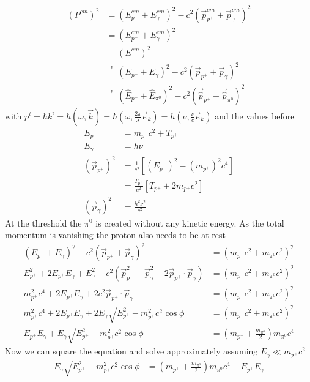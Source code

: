 \documentclass[10pt,a4paper]{article}
\theoremstyle{definition}
\begin{document}
\begin{enumerate}
    \begin{align}
        \left(P^{cm}\right)^2&=(E_{p^+}^{cm}+E_\gamma^{cm})^2-c^2(\vec{p}_{p^+}^{cm}+\vec{p}_\gamma^{cm})^2\\
        &=(E_{p^+}^{cm}+E_\gamma^{cm})^2\\
        &=(E^{cm})^2\\
        &\overset{!}{=}(E_{p^+}+E_\gamma)^2-c^2(\vec{p}_{p^+}+\vec{p}_\gamma)^2\\
        &\overset{!}{=}(\hat{E}_{p^+}+\hat{E}_{\pi^0})^2-c^2(\vec{\hat{p}}_{p^+}+\vec{\hat{p}}_{\pi^0})^2
    \end{align}
    with $p^i=\hbar k^i=\hbar(\omega,\vec{k})=\hbar(\omega,\frac{2\pi}{\lambda}\vec{e}_k)=h(\nu,\frac{\nu}{c}\vec{e}_k)$ and the values before
    \begin{align}
        E_{p^+}&=m_{p^+}c^2+T_{p^+}\\
        E_\gamma&=h\nu\\  
        (\vec{p}_{p^+})^2
        &=\frac{1}{c^2}\left[(E_{p^+})^2-(m_{p^+})^2c^4\right]\\
        &=\frac{T_{p^+}}{c^2}\left[T_{p^+}+2m_{p^+}c^2\right]\\
        (\vec{p}_\gamma)^2&=\frac{h^2\nu^2}{c^2}
    \end{align}
    At the threshold the $\pi^0$ is created without any kinetic energy. As the total momentum is vanishing the proton
    also needs to be at rest
    \begin{align}
        (E_{p^+}+E_\gamma)^2-c^2(\vec{p}_{p^+}+\vec{p}_\gamma)^2&=\left(m_{p^+}c^2+m_{\pi^0}c^2\right)^2\\
        E_{p^+}^2+2E_{p^+}E_\gamma+E_\gamma^2-c^2\left(\vec{p}_{p^+}^2+\vec{p}_\gamma^2-2\vec{p}_{p^+}\cdot\vec{p}_\gamma\right)&=\left(m_{p^+}c^2+m_{\pi^0}c^2\right)^2\\
        m_{p^+}^2c^4+2E_{p^+}E_\gamma+2c^2\vec{p}_{p^+}\cdot\vec{p}_\gamma&=\left(m_{p^+}c^2+m_{\pi^0}c^2\right)^2\\
        m_{p^+}^2c^4+2E_{p^+}E_\gamma+2E_\gamma\sqrt{E_{p^+}^2-m_{p^+}^2c^2}\cos{\phi}&=\left(m_{p^+}c^2+m_{\pi^0}c^2\right)^2\\
        E_{p^+}E_\gamma+E_\gamma\sqrt{E_{p^+}^2-m_{p^+}^2c^2}\cos{\phi}&=\left(m_{p^+}+\frac{m_{\pi^0}}{2}\right)m_{\pi^0}c^4
    \end{align}
    Now we can square the equation and solve approximately assuming $E_\gamma\ll m_{p^+}c^2$
    \begin{align}
        E_\gamma\sqrt{E_{p^+}^2-m_{p^+}^2c^2}\cos{\phi}&=\left(m_{p^+}+\frac{m_{\pi^0}}{2}\right)m_{\pi^0}c^4-E_{p^+}E_\gamma\\

\end{align}
\end{enumerate}
\end{document}
